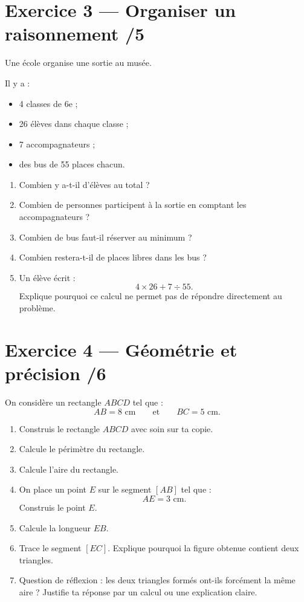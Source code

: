 \documentclass[11pt,a4paper]{article}
\begin{document}
\vspace{4mm}

\section*{Exercice 3 — Organiser un raisonnement \hfill /5}

Une école organise une sortie au musée.

Il y a :
\begin{itemize}
    \item 4 classes de 6e ;
    \item 26 élèves dans chaque classe ;
    \item 7 accompagnateurs ;
    \item des bus de 55 places chacun.
\end{itemize}

\begin{enumerate}[label=\textbf{\arabic*)}]
    \item Combien y a-t-il d'élèves au total ?
    \item Combien de personnes participent à la sortie en comptant les accompagnateurs ?
    \item Combien de bus faut-il réserver au minimum ?
    \item Combien restera-t-il de places libres dans les bus ?
    \item Un élève écrit :
    \[
    4 \times 26 + 7 \div 55.
    \]
    Explique pourquoi ce calcul ne permet pas de répondre directement au problème.
\end{enumerate}

\vspace{4mm}

\section*{Exercice 4 — Géométrie et précision \hfill /6}

On considère un rectangle $ABCD$ tel que :
\[
AB = 8 \text{ cm}
\qquad \text{et} \qquad
BC = 5 \text{ cm}.
\]

\begin{enumerate}[label=\textbf{\arabic*)}]
    \item Construis le rectangle $ABCD$ avec soin sur ta copie.
    \item Calcule le périmètre du rectangle.
    \item Calcule l'aire du rectangle.
    \item On place un point $E$ sur le segment $[AB]$ tel que :
    \[
    AE = 3 \text{ cm}.
    \]
    Construis le point $E$.
    \item Calcule la longueur $EB$.
    \item Trace le segment $[EC]$. Explique pourquoi la figure obtenue contient deux triangles.
    \item Question de réflexion : les deux triangles formés ont-ils forcément la même aire ? Justifie ta réponse par un calcul ou une explication claire.
\end{enumerate}
\end{document}
